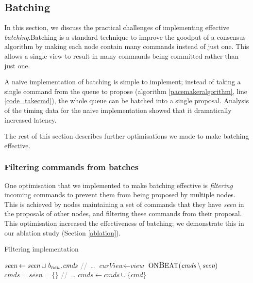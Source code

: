 \subsection{Batching} \label{batching}
In this section, we discuss the practical challenges of implementing effective \textit{batching}.Batching is a standard technique to improve the goodput of a consensus algorithm by making each node contain many commands instead of just one. This allows a single view to result in many commands being committed rather than just one.

A naive implementation of batching is simple to implement; instead of taking a single command from the queue to propose (algorithm \ref{pacemakeralgorithm}, line \ref{code_takecmd}), the whole queue can be batched into a single proposal. Analysis of the timing data for the naive implementation showed that it dramatically increased latency.

The rest of this section describes further optimisations we made to make batching effective.

\subsubsection{Filtering commands from batches} \label{filtering}
One optimisation that we implemented to make batching effective is \textit{filtering} incoming commands to prevent them from being proposed by multiple nodes. This is achieved by nodes maintaining a set of commands that they have \textit{seen} in the proposals of other nodes, and filtering these commands from their proposal. This optimisation increased the effectiveness of batching; we demonstrate this in our ablation study (Section \ref{ablation}).

\begin{algorithm}[h!]
	\caption{Filtering implementation} \label{dedup}
	\begin{algorithmic}[1]
			\State $ \textit{seen} \gets \textit{seen} \cup \textit{b\textsubscript{new}.cmds}$
			\State \textcolor{gray}{//\ \dots}
		\EndIf
	\EndProcedure
		\State $ \textit{curView} \gets \textit{view}$
		\State $ \text{ON{\large B}EAT}(\textit{cmds} \setminus \textit{seen})$
		\State $ \textit{cmds} = \textit{seen} = \{\}$ \label{smalloptimisation}
		\State \textcolor{gray}{//\ \dots}
	\EndProcedure
		\State $ \textit{cmds} \gets \textit{cmds} \cup \{\textit{cmd}\} $
	\EndProcedure
	\end{algorithmic}
\end{algorithm}

